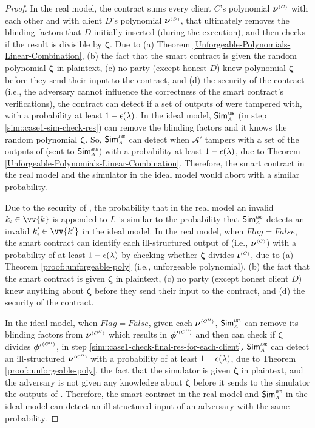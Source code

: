 \begin{proof}
In the real model,  the contract sums every client $C$'s polynomial $\bm\nu^{ \scriptscriptstyle {  {(C)}} }$ with each other and with client $D$'s polynomial $\bm\nu^{ \scriptscriptstyle {  {(D)}} }$, that ultimately removes the blinding factors that  $D$ initially inserted (during the \vopr execution), and then checks if the result is divisible by  $\bm \zeta$. Due to (a) Theorem \ref{Unforgeable-Polynomials-Linear-Combination}, (b) the fact that the smart contract is given the random polynomial $\bm \zeta$ in plaintext, (c) no party (except honest $D$) knew polynomial $\bm \zeta$ before they send their input to the contract, and (d) the security of the contract (i.e., the adversary cannot influence the correctness of the smart contract's verifications), the contract can detect if a set of outputs of \vopr were tampered with, with a probability at least $1-\epsilon(\lambda)$. In the ideal model, $\mathsf{Sim}^{\scriptscriptstyle \mathtt{ANE}}_{\scriptscriptstyle A}$ (in step \ref{sim::case1-sim-check-res}) can remove the blinding factors and it knows the random polynomial ${\bm \zeta}$. So, $\mathsf{Sim}^{\scriptscriptstyle \mathtt{ANE}}_{\scriptscriptstyle A}$ can detect when $\mathcal{A}'$ tampers with a set of the outputs of \vopr (sent to  $\mathsf{Sim}^{\scriptscriptstyle \mathtt{ANE}}_{\scriptscriptstyle A}$) with a probability at least $1-\epsilon(\lambda)$,  due to Theorem \ref{Unforgeable-Polynomials-Linear-Combination}. Therefore, the smart contract in the real model and the simulator in the ideal model would abort with a similar probability. 




Due to the security of \zspaa, the probability that in the real model an invalid $k_{\st i}\in \vv{k}$ is appended to $ L$ is similar to the probability that  $\mathsf{Sim}^{\scriptscriptstyle \mathtt{ANE}}_{\scriptscriptstyle A}$ detects an invalid $ k'_{\st i}\in \vv{k'}$ in the ideal model. In the real model, when $Flag=False$, the smart contract can identify each ill-structured output of \vopr (i.e.,  $\bm\nu^{ \scriptscriptstyle {  {(C)}} }$) with a probability of at least $1-\epsilon(\lambda)$ by checking whether $\bm\zeta$  divides $\bm\iota^{ \scriptscriptstyle {  {(C)}}}$, due to  (a) Theorem \ref{proof::unforgeable-poly} (i.e., unforgeable polynomial), (b) the fact that the smart contract is given $\bm \zeta$ in plaintext, (c) no party (except honest client $D$) knew anything about $\bm \zeta$ before they send their input to the contract, and (d) the security of the contract.  

In the ideal model, when $Flag=False$, given each ${\bm\nu}^{ \scriptscriptstyle {  {(C'')}} }$, $\mathsf{Sim}^{\scriptscriptstyle \mathtt{ANE}}_{\scriptscriptstyle A}$ can remove its blinding factors from  ${\bm\nu}^{ \scriptscriptstyle {  {(C'')}} }$ which results in $ {\bm\phi'}^{ \scriptscriptstyle {  {(C'')}} }$ and then can check if ${\bm\zeta}$  divides $ {\bm\phi'}^{ \scriptscriptstyle {  {(C'')}} }$, in step \ref{sim::case1-check-final-res-for-each-client}. $\mathsf{Sim}^{\scriptscriptstyle \mathtt{ANE}}_{\scriptscriptstyle A}$ can detect an ill-structured  ${\bm\nu}^{ \scriptscriptstyle {  {(C'')}} }$ with a probability of at least $1-\epsilon(\lambda)$, due to Theorem \ref{proof::unforgeable-poly}, the fact that the simulator is given ${\bm \zeta}$ in plaintext,  and the adversary is not given any knowledge about ${\bm \zeta}$ before it sends to the simulator the outputs of \vopr.  Therefore, the smart contract in the real model and $\mathsf{Sim}^{\scriptscriptstyle \mathtt{ANE}}_{\scriptscriptstyle A}$ in the ideal model can detect an ill-structured input of an adversary with the same probability.  


\end{proof}
